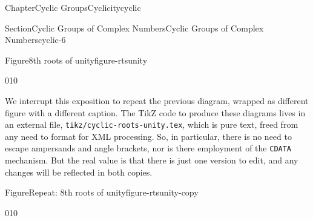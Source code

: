 \documentclass[oneside,10pt,]{book}
\newcommand{\mono}[1]{\texttt{#1}}
\numberwithin{equation}{section}
\begin{document}
\begin{chapterptx}{Chapter}{Cyclic Groups}{}{Cyclicity}{}{}{cyclic}
\begin{sectionptx}{Section}{Cyclic Groups of Complex Numbers}{}{Cyclic Groups of Complex Numbers}{}{}{cyclic-6}
\begin{figureptx}{Figure}{8th roots of unity}{figure-rtsunity}{}
\begin{image}{0}{1}{0}{}
{\begin{tikzpicture}[scale=1.65]
\end{tikzpicture}%
}%
\end{image}%
\tcblower
\end{figureptx}%
We interrupt this exposition to repeat the previous diagram, wrapped as different figure with a different caption.  The TikZ code to produce these diagrams lives in an external file, \mono{tikz/cyclic-roots-unity.tex}, which is pure text, freed from any need to format for XML processing.  So, in particular, there is no need to escape ampersands and angle brackets, nor is there employment of the \mono{CDATA} mechanism.  But the real value is that there is just one version to edit, and any changes will be reflected in both copies.%
\begin{figureptx}{Figure}{Repeat: 8th roots of unity}{figure-rtsunity-copy}{}%
\begin{image}{0}{1}{0}{}%
\end{image}
\end{figureptx}
\end{sectionptx}
\end{chapterptx}
\end{document}
